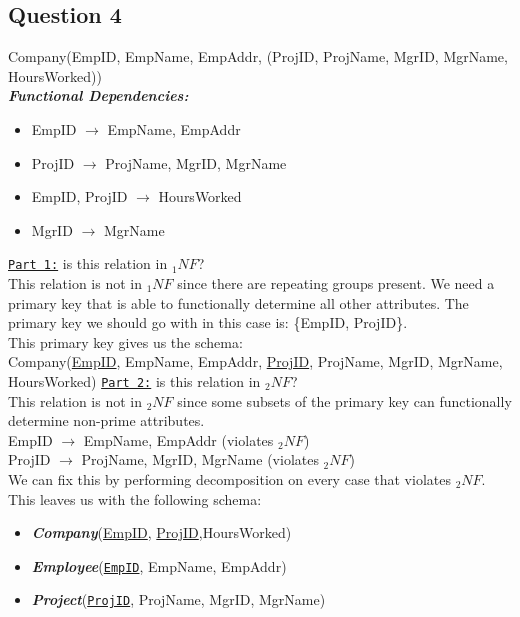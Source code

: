 \documentclass[letterpaper, 11pt]{article}
\newcommand{\1}{\mathds{1}}	%
\theoremstyle{definition}
\begin{document}
\subsection*{Question 4}
\begin{mdframed}
Company(EmpID, EmpName, EmpAddr, (ProjID, ProjName, MgrID, MgrName, HoursWorked)) \vspace{1.5mm} \\
\textit{\textbf{Functional Dependencies:}} 
\begin{itemize}
    \item[\ding{228}] EmpID $\rightarrow$ EmpName, EmpAddr
    \item[\ding{228}] ProjID $\rightarrow$ ProjName, MgrID, MgrName
        \item[\ding{228}]  EmpID, ProjID $\rightarrow$ HoursWorked
        \item[\ding{228}] MgrID $\rightarrow$ MgrName
\end{itemize}
\end{mdframed}
\underline{\texttt{Part 1:}} is this relation in $_1NF$? \\
This relation is not in $_1NF$ since there are repeating groups present. We need a primary key that is able to functionally determine all other attributes. The primary key we should go with in this case is: \{EmpID, ProjID\}. \vspace{2mm}\\
This primary key gives us the schema: \\
Company(\underline{EmpID}, EmpName, EmpAddr, \underline{ProjID}, ProjName, MgrID, MgrName, HoursWorked)
\bigbreak \noindent
\underline{\texttt{Part 2:}} is this relation in $_2NF$? \\
This relation is not in $_2NF$ since some subsets of the primary key can functionally determine non-prime attributes. \vspace{2mm} \\
EmpID $\rightarrow$ EmpName, EmpAddr (violates $_2NF$) \\
ProjID $\rightarrow$ ProjName, MgrID, MgrName (violates $_2NF$) \vspace{2mm}\\
We can fix this by performing decomposition on every case that violates $_2NF$. This leaves us with the following schema:
\begin{itemize}
    \item[\ding{228}] \textit{\textbf{Company}}(\underline{EmpID}, \underline{ProjID},HoursWorked)
    \item[\ding{228}] \textit{\textbf{Employee}}(\texttt{\underline{EmpID}}, EmpName, EmpAddr)
    \item[\ding{228}] \textit{\textbf{Project}}(\underline{\texttt{ProjID}}, ProjName, MgrID, MgrName)
\end{itemize}
\end{document}
